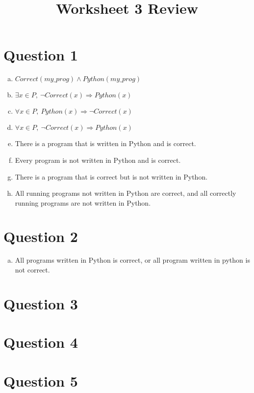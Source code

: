\documentclass[12pt]{article}
\begin{document}
\title{Worksheet 3 Review}
\maketitle

\section*{Question 1}
\begin{enumerate}[a.]
    \item

    $Correct(my\_prog) \land Python(my\_prog)$

    \item

    $\exists x \in P,\:\neg Correct(x) \Rightarrow Python(x)$

    \item

    $\forall x \in P,\:Python(x) \Rightarrow \neg Correct(x)$

    \item

    $\forall x \in P,\:\neg Correct(x) \Rightarrow Python(x)$

    \item

    There is a program that is written in Python and is correct.

    \item

    Every program is not written in Python and is correct.

    \item

    There is a program that is correct but is not written in Python.

    \item

    All running programs not written in Python are correct, and all correctly
    running programs are not written in Python.

\end{enumerate}

\section*{Question 2}
\begin{enumerate}[a.]
    \item

    All programs written in Python is correct, or all program written in python
    is not correct.

\end{enumerate}

\section*{Question 3}

\section*{Question 4}

\section*{Question 5}
\end{document}
